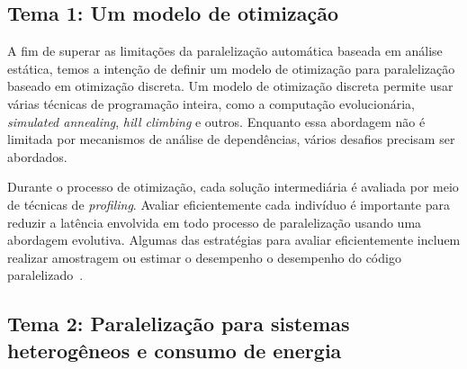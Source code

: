 \documentclass[a4paper,12pt]{article}
\newcommand\FIXME[1]{\textcolor{red}{FIX:}\textcolor{red}{#1}}
\begin{document}

\subsection{Tema 1: Um modelo de otimização}

A fim de superar as limitações da paralelização automática baseada em análise estática, temos a intenção de definir um modelo de otimização para paralelização baseado em otimização discreta. Um modelo de otimização discreta permite usar várias técnicas de programação inteira, como a computação evolucionária, \textit{simulated annealing}, \textit{hill climbing} e outros. Enquanto essa abordagem não é limitada por mecanismos de análise de dependências, vários desafios precisam ser abordados.


Durante o processo de otimização, cada solução intermediária é avaliada por meio de técnicas de \textit{profiling}. Avaliar eficientemente cada indivíduo é importante para reduzir a latência envolvida em todo processo de paralelização usando uma abordagem evolutiva. Algumas das estratégias para avaliar eficientemente incluem realizar amostragem ou estimar o desempenho o desempenho do código paralelizado~\cite{douskos11,misailovic11,zhu12,fahringer95b,fahringer00,fahringer11}.


\subsection{Tema 2: Paralelização para sistemas heterogêneos e consumo de energia}
\end{document}
